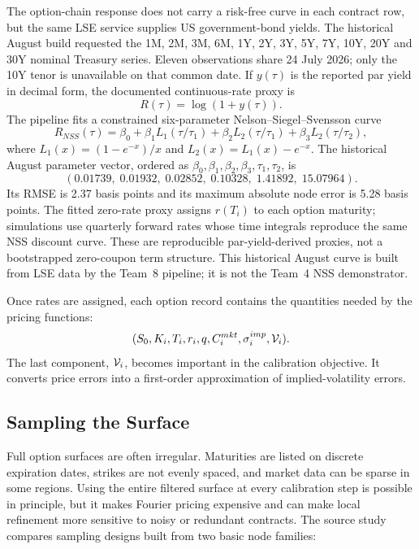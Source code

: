 The option-chain response does not carry a risk-free curve in each contract row, but the same LSE service supplies US government-bond yields. The historical August build requested the 1M, 2M, 3M, 6M, 1Y, 2Y, 3Y, 5Y, 7Y, 10Y, 20Y and 30Y nominal Treasury series. Eleven observations share 24 July 2026; only the 10Y tenor is unavailable on that common date. If \(y(\tau)\) is the reported par yield in decimal form, the documented continuous-rate proxy is
\[
    R(\tau)=\log\!\left(1+y(\tau)\right).
\]
The pipeline fits a constrained six-parameter Nelson--Siegel--Svensson curve
\[
R_{NSS}(\tau)=\beta_0+\beta_1L_1(\tau/\tau_1)
+\beta_2L_2(\tau/\tau_1)+\beta_3L_2(\tau/\tau_2),
\]
where \(L_1(x)=(1-e^{-x})/x\) and \(L_2(x)=L_1(x)-e^{-x}\). The historical August
parameter vector, ordered as \(\beta_0,\beta_1,\beta_2,\beta_3,\tau_1,\tau_2\),
is
\[
(0.01739,\;0.01932,\;0.02852,\;0.10328,\;1.41892,\;15.07964).
\]
Its RMSE is 2.37
basis points and its maximum absolute node error is 5.28 basis points. The
fitted zero-rate proxy assigns \(r(T_i)\) to each option maturity; simulations
use quarterly forward rates whose time integrals reproduce the same NSS
discount curve. These are reproducible par-yield-derived proxies, not a
bootstrapped zero-coupon term structure. This historical August curve is
built from LSE data by the Team~8 pipeline; it is not the Team~4 NSS
demonstrator.

Once rates are assigned, each option record contains the quantities needed by the pricing functions:
\[
    (S_0,K_i,T_i,r_i,q,C_i^{mkt},\sigma_i^{imp},\mathcal{V}_i).
\]
The last component, \(\mathcal{V}_i\), becomes important in the calibration objective. It converts price errors into a first-order approximation of implied-volatility errors.

\vspace{0.5cm}
\subsection{Sampling the Surface}

Full option surfaces are often irregular. Maturities are listed on discrete expiration dates, strikes are not evenly spaced, and market data can be sparse in some regions. Using the entire filtered surface at every calibration step is possible in principle, but it makes Fourier pricing expensive and can make local refinement more sensitive to noisy or redundant contracts. The source study~\cite{team8} compares sampling designs built from two basic node families:

